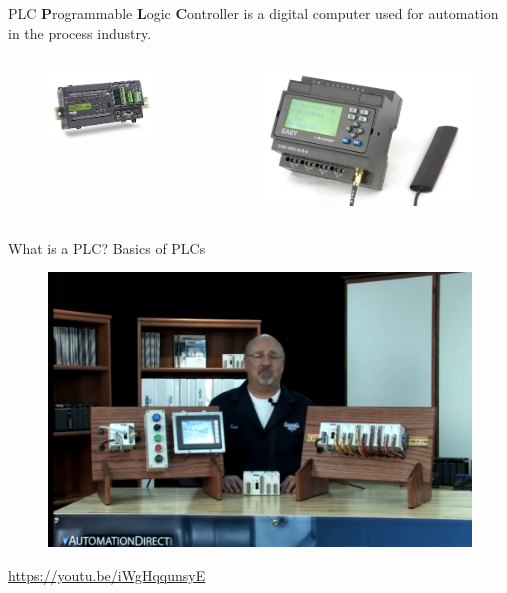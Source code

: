 \begin{frame}{PLC}
	\textbf{P}rogrammable \textbf{L}ogic \textbf{C}ontroller is a digital computer used for automation in the process industry. 
	\begin{columns}
		\begin{column}{0.5\textwidth}
			\begin{figure}
				\centering
				\includegraphics[width=0.7\linewidth]{img/PLC_1}
			\end{figure}

		\end{column}
		\begin{column}{0.5\textwidth}
			\begin{figure}
				\centering
				\includegraphics[width=0.7\linewidth]{img/PLC_2}
			\end{figure}
		\end{column}
	\end{columns}
\end{frame}

\begin{frame}{What is a PLC? Basics of PLCs}
	\begin{figure}
		\centering
		\includegraphics[width=0.7\linewidth]{img/what_is_a_plc}
	\end{figure}
	\url{https://youtu.be/iWgHqqunsyE}
\end{frame}

